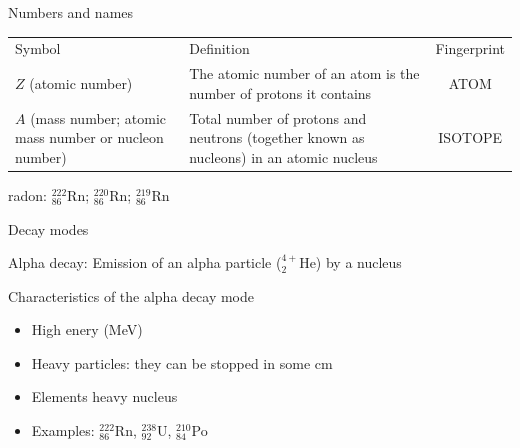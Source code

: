 \begin{frame}{Numbers and names}

\begin{table}[H]
\vskip -0.5cm
\begin{center}
  \begin{tabular}{p{3cm}p{4cm}c}
  \toprule
Symbol      & Definition & Fingerprint   \\ \otoprule 
$Z$ (atomic number) & The atomic number of an atom is the number of protons it contains & ATOM \\
$A$ (mass number; atomic mass number or nucleon number) &  Total number of protons and neutrons (together known as nucleons) in an atomic nucleus & ISOTOPE  \\ \bottomrule
\end{tabular}
\end{center}
\end{table}

\pause \centering \alert{radon: $^{222}_{86}$Rn; $^{220}_{86}$Rn; $^{219}_{86}$Rn}

\end{frame}

\begin{frame}{Decay modes}

\alert{Alpha decay: Emission of an alpha particle ($^{4+}_{2}$He) by a nucleus}

\begin{exampleblock}{Characteristics of the alpha decay mode}

\begin{itemize}
\item High enery (MeV)
\item Heavy particles: they can be stopped in some cm 
\item Elements heavy nucleus
\item Examples: $^{222}_{86}$Rn, $^{238}_{92}$U, $^{210}_{84}$Po
\end{itemize}

\end{exampleblock}

\end{frame}

